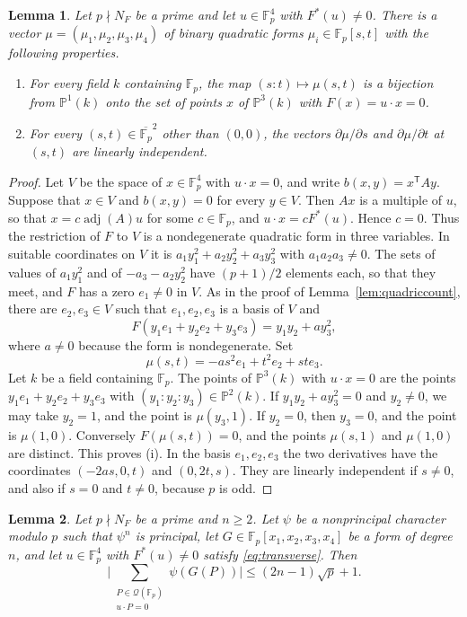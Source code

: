\documentclass[11pt]{amsart}
\numberwithin{equation}{section}
\numberwithin{figure}{section}
\newtheorem{lemma}{Lemma}[section]
\theoremstyle{definition}
\newcommand{\Fp}{\mathbb F_p}
\newcommand{\PP}{\mathbb P}
\newcommand{\Qc}{\mathcal Q}
\newcommand{\adj}{\operatorname{adj}}
\begin{document}
\begin{lemma}\label{lem:conic}
Let $p\nmid N_F$ be a prime and let $u\in\Fp^4$ with $F^*(u)\ne0$.
There is a vector $\mu=(\mu_1,\mu_2,\mu_3,\mu_4)$ of binary quadratic
forms $\mu_i\in\Fp[s,t]$ with the following properties.
\begin{enumerate}
\item[\textup{(i)}] For every field $k$ containing $\Fp$, the map
$(s:t)\mapsto\mu(s,t)$ is a bijection from $\PP^1(k)$ onto the set of
points $x$ of $\PP^3(k)$ with $F(x)=u\cdot x=0$.
\item[\textup{(ii)}] For every $(s,t)\in\overline{\Fp}^2$ other than
$(0,0)$, the vectors $\partial\mu/\partial s$ and
$\partial\mu/\partial t$ at $(s,t)$ are linearly independent.
\end{enumerate}
\end{lemma}

\begin{proof}
Let $V$ be the space of $x\in\Fp^4$ with $u\cdot x=0$, and write
$b(x,y)=x^{\mathsf T}Ay$. Suppose that $x\in V$ and $b(x,y)=0$ for
every $y\in V$. Then $Ax$ is a multiple of $u$, so that
$x=c\adj(A)u$ for some $c\in\Fp$, and $u\cdot x=cF^*(u)$. Hence
$c=0$. Thus the restriction of $F$ to $V$ is a nondegenerate
quadratic form in three variables. In suitable coordinates on $V$ it
is $a_1y_1^2+a_2y_2^2+a_3y_3^2$ with $a_1a_2a_3\ne0$. The sets of
values of $a_1y_1^2$ and of $-a_3-a_2y_2^2$ have $(p+1)/2$ elements
each, so that they meet, and $F$ has a zero $e_1\ne0$ in $V$. As in
the proof of Lemma~\ref{lem:quadriccount}, there are $e_2,e_3\in V$
such that $e_1,e_2,e_3$ is a basis of $V$ and
\[
 F(y_1e_1+y_2e_2+y_3e_3)=y_1y_2+ay_3^2,
\]
where $a\ne0$ because the form is nondegenerate. Set
\[
 \mu(s,t)=-as^2e_1+t^2e_2+ste_3.
\]
Let $k$ be a field containing $\Fp$. The points of $\PP^3(k)$ with
$u\cdot x=0$ are the points $y_1e_1+y_2e_2+y_3e_3$ with
$(y_1:y_2:y_3)\in\PP^2(k)$. If $y_1y_2+ay_3^2=0$ and $y_2\ne0$, we
may take $y_2=1$, and the point is $\mu(y_3,1)$. If $y_2=0$, then
$y_3=0$, and the point is $\mu(1,0)$. Conversely $F(\mu(s,t))=0$, and
the points $\mu(s,1)$ and $\mu(1,0)$ are distinct. This proves (i).
In the basis $e_1,e_2,e_3$ the two derivatives have the coordinates
$(-2as,0,t)$ and $(0,2t,s)$. They are linearly independent if
$s\ne0$, and also if $s=0$ and $t\ne0$, because $p$ is odd.
\end{proof}

\begin{lemma}\label{lem:section}
Let $p\nmid N_F$ be a prime and $n\ge2$. Let $\psi$ be a nonprincipal
character modulo $p$ such that $\psi^n$ is principal, let
$G\in\Fp[x_1,x_2,x_3,x_4]$ be a form of degree $n$, and let
$u\in\Fp^4$ with $F^*(u)\ne0$ satisfy \eqref{eq:transverse}. Then
\begin{equation}\label{eq:section}
 \bigg|\sum_{\substack{P\in\Qc(\Fp)\\u\cdot P=0}}\psi(G(P))\bigg|
 \le(2n-1)\sqrt p+1.
\end{equation}
\end{lemma}
\end{document}

